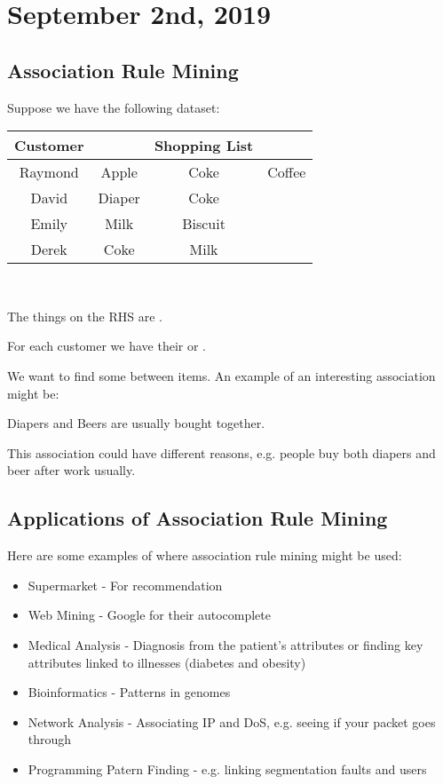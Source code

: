 \documentclass[../main/main.tex]{subfiles}
\begin{document}
\section{September  2nd, 2019}
\subsection{Association Rule Mining}
Suppose we have the following dataset:
\begin{table}[htpb]
	\centering
	\label{tab:label}
	\begin{tabular}{|c|ccc|}
	\hline
	Customer && Shopping List &\\
	\hline
	Raymond & Apple & Coke & Coffee \\
	David & Diaper & Coke & \\
	Emily & Milk & Biscuit & \\
	Derek & Coke & Milk & \\
	\hline
	\end{tabular}
\end{table}\\
\begin{definition}
	The things on the RHS are .
\end{definition}
\begin{definition}
	For each customer we have their  or .
\end{definition}
We want to find some  between items. An example of an interesting association might be:
\begin{example}
	{Diapers} and {Beers} are usually bought together.
\end{example}
This association could have different reasons, e.g. people buy both diapers and beer after work usually.
\subsection{Applications of Association Rule Mining}
Here are some examples of where association rule mining might be used:
\begin{itemize}
	\item Supermarket - For recommendation
	\item Web Mining - Google for their autocomplete
	\item Medical Analysis - Diagnosis from the patient's attributes or finding key attributes linked to illnesses (diabetes and obesity)
	\item Bioinformatics - Patterns in genomes
	\item Network Analysis - Associating IP and DoS, e.g. seeing if your packet goes through
	\item Programming Patern Finding - e.g. linking segmentation faults and users
\end{itemize}
\end{document}
